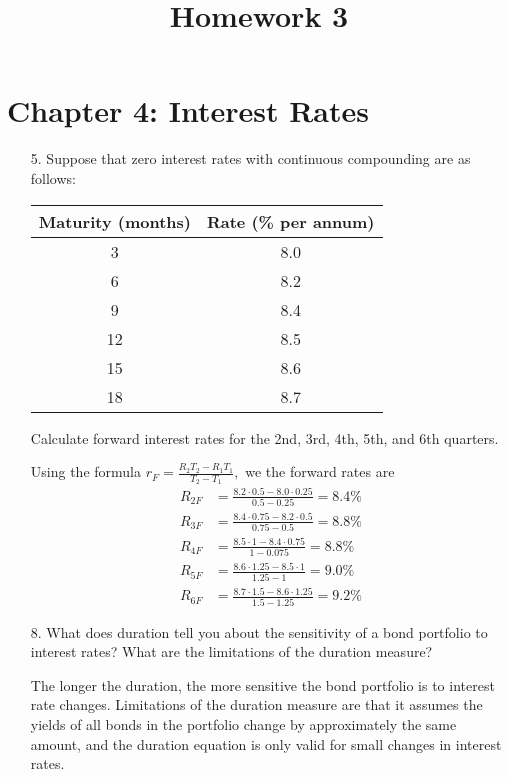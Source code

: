 \documentclass{article}
\begin{document}
\title{Homework 3}
\maketitle
\thispagestyle{fancy}

\section*{Chapter 4: Interest Rates}

\begin{itemize}
	\item[5.] Suppose that zero interest rates with continuous compounding are as follows:
		\begin{center}
			\begin{tabular}{cc}
				Maturity (months) & Rate (\% per annum) \\
				\hline
				3 & 8.0 \\
				6 & 8.2 \\
				9 & 8.4 \\
				12 & 8.5 \\
				15 & 8.6 \\
				18 & 8.7
			\end{tabular}
		\end{center}
		Calculate forward interest rates for the 2nd, 3rd, 4th, 5th, and 6th quarters.
		\begin{soln}
			Using the formula $r_F=\frac{R_2T_2-R_1T_1}{T_2-T_1},$ we the forward rates are
			\begin{align*}
				R_{2F} &= \frac{8.2\cdot 0.5-8.0\cdot0.25}{0.5-0.25} = 8.4\% \\
				R_{3F} &= \frac{8.4\cdot 0.75-8.2\cdot 0.5}{0.75-0.5} = 8.8\% \\
				R_{4F} &= \frac{8.5\cdot 1 - 8.4\cdot 0.75}{1-0.075} = 8.8\% \\
				R_{5F} &= \frac{8.6\cdot 1.25 - 8.5\cdot 1}{1.25-1} = 9.0\% \\
				R_{6F} &= \frac{8.7\cdot 1.5-8.6\cdot 1.25}{1.5-1.25} = 9.2\%
			\end{align*}
		\end{soln}

	\item[8.] What does duration tell you about the sensitivity of a bond portfolio to interest rates? What are the limitations of the duration measure?
		\begin{answer*}
			The longer the duration, the more sensitive the bond portfolio is to interest rate changes. Limitations of the duration measure are that it assumes the yields of all bonds in the portfolio change by approximately the same amount, and the duration equation is only valid for small changes in interest rates.
		\end{answer*}


\end{itemize}
\end{document}
